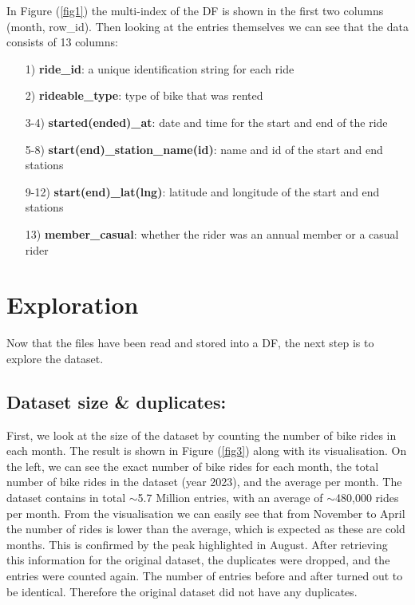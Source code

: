 \documentclass[12pt]{article}
\begin{document}
	In Figure (\underline{\ref{fig1}}) the multi-index of the DF is shown in the first two columns (month, row\_id). Then looking at the entries themselves we can see that the data consists of 13 columns: 
	\begin{itemize}
	\item [1)] \textbf{ride\_id}: a unique identification string for each ride
	\item [2)] \textbf{rideable\_type}: type of bike that was rented
	\item [3-4)] \textbf{started(ended)\_at}: date and time for the start and end of the ride
	\item [5-8)]  \textbf{start(end)\_station\_name(id)}: name and id of the start and end stations
	\item [9-12)] \textbf{start(end)\_lat(lng)}: latitude and longitude of the start and end stations
	\item [13)] \textbf{member\_casual}: whether the rider was an annual member or a casual rider 
	\end{itemize}

\section{Exploration}
Now that the files have been read and stored into a DF, the next step is to explore the dataset.
 
\subsection{Dataset size \& duplicates:}
First, we look at the size of the dataset by counting the number of bike rides in each month. The result is shown in Figure (\underline{\ref{fig3}}) along with its visualisation. On the left, we can see the exact number of bike rides for each month, the total number of bike rides in the dataset (year 2023), and the average per month. The dataset contains in total $\sim$5.7 Million entries, with an average of $\sim$480,000 rides per month. From the visualisation we can easily see that from November to April the number of rides is lower than the average, which is expected as these are cold months. This is confirmed by the peak highlighted in August. After retrieving this information for the original dataset, the duplicates were dropped, and the entries were counted again. The number of entries before and after turned out to be identical. Therefore the original dataset did not have any duplicates.\\ 
	
\end{document}
